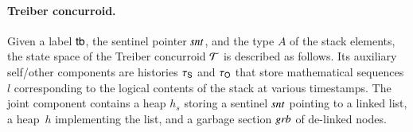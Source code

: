 \newcommand{\tbinv}{I}

\paragraph{Treiber concurroid.}
Given a label $\mathsf{tb}$, the sentinel pointer $\mathit{snt}$, and the type $A$
of the stack elements, the state space of the Treiber concurroid
$\mathcal{T}$ is described as follows. Its auxiliary self/other components
are histories $\tau_{\mathsf{S}}$ and $\tau_{\mathsf{O}}$ that store mathematical sequences
$l$ corresponding to the logical contents of the stack at various
timestamps. The joint component contains a heap $h_s$ storing a
sentinel $\mathit{snt}$ pointing to a linked list, a heap~$h$ implementing
the list, and a garbage section $\mathit{grb}$ of de-linked
nodes.
%
%
%

